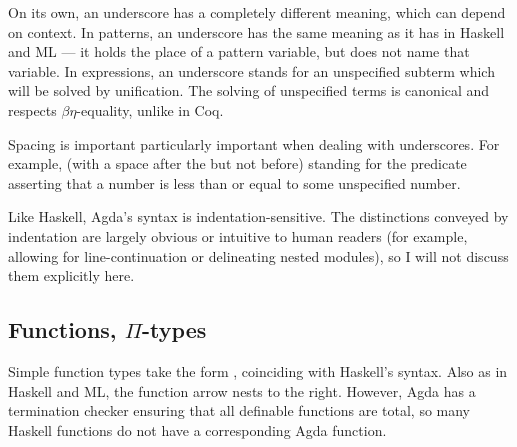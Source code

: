 On its own, an underscore has a completely different meaning, which can depend
on context.
In patterns, an underscore has the same meaning as it has in Haskell and ML ---
it holds the place of a pattern variable, but does not name that variable.
In expressions, an underscore stands for an unspecified subterm which will be
solved by unification.
The solving of unspecified terms is canonical and respects $\beta\eta$-equality,
unlike in Coq.

Spacing is important particularly important when dealing with underscores.
For example,
\AgdaDatatype{\_$\leq$}\AgdaSpace{}\AgdaSymbol{\_} (with a space after the
\AgdaDatatype{$\leq$} but not before) standing for the predicate asserting that
a number is less than or equal to some unspecified number.

Like Haskell, Agda's syntax is indentation-sensitive.
The distinctions conveyed by indentation are largely obvious or intuitive to
human readers (for example, allowing for line-continuation or delineating nested
modules), so I will not discuss them explicitly here.

\subsection{Functions, $\Pi$-types}\label{sec:pi-types}

Simple function types take the form
\AgdaSpace{}\AgdaSymbol{$\to$}\AgdaSpace{},
coinciding with Haskell's syntax.
Also as in Haskell and ML, the function arrow nests to the right.
However, Agda has a termination checker ensuring that all definable functions
are total, so many Haskell functions do not have a corresponding Agda function.

